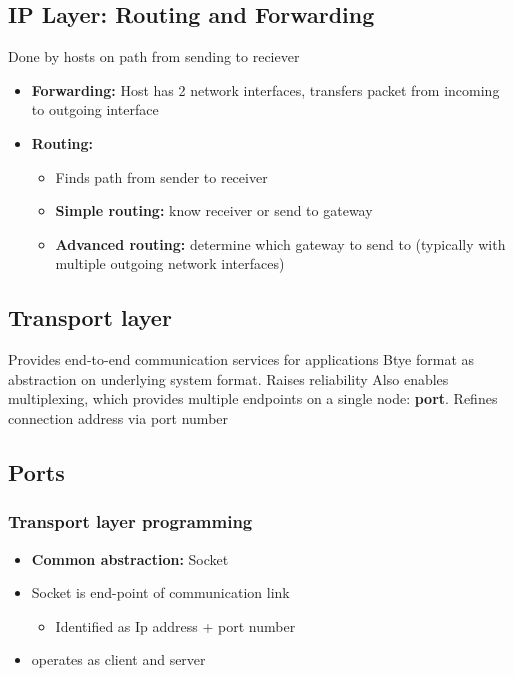 \documentclass{report}
\begin{document}
     \subsection{IP Layer: Routing and Forwarding}
     \bigbreak \noindent 
     Done by hosts on path from sending to reciever
     \begin{itemize}
         \item \textbf{Forwarding:} Host has 2 network interfaces, transfers packet from incoming to outgoing interface
            \item \textbf{Routing:} 
                \begin{itemize}
                    \item Finds path from sender to receiver
                    \item \textbf{Simple routing:} know receiver or send to gateway
                    \item \textbf{Advanced routing:} determine which gateway to send to (typically with multiple outgoing network interfaces)
                \end{itemize}
     \end{itemize}

     \bigbreak \noindent 
     \subsection{Transport layer}
     \bigbreak \noindent 
     Provides end-to-end communication services for applications
     \bigbreak \noindent 
     Btye format as abstraction on underlying system format. Raises reliability
     \bigbreak \noindent 
     Also enables multiplexing, which provides multiple endpoints on a single node: \textbf{port}.
     \bigbreak \noindent 
     Refines connection address via port number
     \bigbreak \noindent 
     \subsection{Ports}
     \bigbreak \noindent 

     \bigbreak \noindent 
     \subsubsection{Transport layer programming}
     \bigbreak \noindent 
     \begin{itemize}
         \item \textbf{Common abstraction:} Socket
            \item Socket is end-point of communication link
                \begin{itemize}
                    \item Identified as Ip address + port number
                \end{itemize}
            \item operates as client and server
     \end{itemize}
\end{document}
